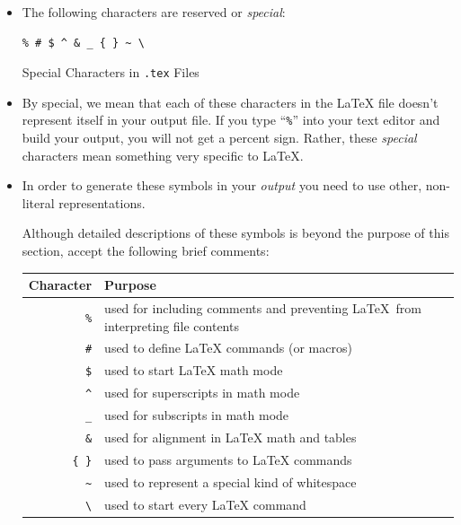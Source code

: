 \begin{itemize}

\item The following characters are reserved or \textit{special}:

  \begin{table}[h]
    \centering
    \begin{center}
      \begin{minipage}{.5\textwidth}
        \begin{framed}
\begin{verbatim}
% # $ ^ & _ { } ~ \
\end{verbatim}
        \end{framed}
      \end{minipage}
    \end{center}
    \caption{Special Characters in \texttt{.tex} Files} \label{tab:spec}
  \end{table}

\item By special, we mean that each of these characters in the \LaTeX{} file
  doesn't represent itself in your output file. If you type ``\texttt{\%}'' into
  your text editor and build your output, you will not get a percent
  sign. Rather, these \textit{special} characters mean something very specific
  to \LaTeX{}.

\item In order to generate these symbols in your \textit{output} you need to use
  other, non-literal representations.

  Although detailed descriptions of these symbols is beyond
  the purpose of this section, accept the following brief comments:\\

  \begin{table}[h]
    \centering
    \begin{framed}
      \begin{tabular}[h]{r p{3.5in}}
        \textbf{Character} & \textbf{Purpose} \\
        \hline
        \texttt{\%} & used for including comments and preventing \LaTeX ~from interpreting file contents \\
        \texttt{\#} & used to define \LaTeX{} commands (or macros) \\
        \texttt{\$} & used to start \LaTeX{} math mode \\
        \texttt{\textasciicircum{}} & used for superscripts in math mode \\
        \texttt{\_} & used for subscripts in math mode \\
        \texttt{\&} & used for alignment in \LaTeX{} math and tables \\
        \texttt{\{ \}} & used to pass arguments to \LaTeX{} commands \\
        \texttt{\~{}} & used to represent a special kind of whitespace \\
        \texttt{\textbackslash} & used to start every \LaTeX{} command \\
      \end{tabular}
    \end{framed}


\end{table}
\end{itemize}
